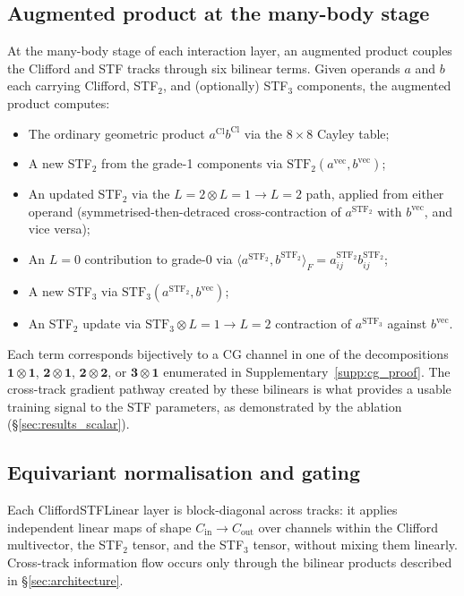 \subsection{Augmented product at the many-body stage}\label{supp:aug_prod}

At the many-body stage of each interaction layer, an augmented product couples the Clifford and STF tracks through six bilinear terms. Given operands $a$ and $b$ each carrying Clifford, STF$_2$, and (optionally) STF$_3$ components, the augmented product computes:
\begin{itemize}
    \item The ordinary geometric product $a^{\mathrm{Cl}} b^{\mathrm{Cl}}$ via the $8\times8$ Cayley table;
    \item A new STF$_2$ from the grade-1 components via $\mathrm{STF}_2(a^{\mathrm{vec}}, b^{\mathrm{vec}})$;
    \item An updated STF$_2$ via the $L{=}2 \otimes L{=}1 \to L{=}2$ path, applied from either operand (symmetrised-then-detraced cross-contraction of $a^{\mathrm{STF}_2}$ with $b^{\mathrm{vec}}$, and vice versa);
    \item An $L{=}0$ contribution to grade-0 via $\langle a^{\mathrm{STF}_2}, b^{\mathrm{STF}_2}\rangle_F = a_{ij}^{\mathrm{STF}_2} b_{ij}^{\mathrm{STF}_2}$;
    \item A new STF$_3$ via $\mathrm{STF}_3(a^{\mathrm{STF}_2}, b^{\mathrm{vec}})$;
    \item An STF$_2$ update via $\mathrm{STF}_3 \otimes L{=}1 \to L{=}2$ contraction of $a^{\mathrm{STF}_3}$ against $b^{\mathrm{vec}}$.
\end{itemize}
Each term corresponds bijectively to a CG channel in one of the decompositions $\mathbf{1}\otimes\mathbf{1}$, $\mathbf{2}\otimes\mathbf{1}$, $\mathbf{2}\otimes\mathbf{2}$, or $\mathbf{3}\otimes\mathbf{1}$ enumerated in Supplementary~\ref{supp:cg_proof}. The cross-track gradient pathway created by these bilinears is what provides a usable training signal to the STF parameters, as demonstrated by the ablation (\S\ref{sec:results_scalar}).

\subsection{Equivariant normalisation and gating}\label{supp:normalization}

Each CliffordSTFLinear layer is block-diagonal across tracks: it applies independent linear maps of shape $C_{\mathrm{in}} \to C_{\mathrm{out}}$ over channels within the Clifford multivector, the STF$_2$ tensor, and the STF$_3$ tensor, without mixing them linearly. Cross-track information flow occurs only through the bilinear products described in \S\ref{sec:architecture}.

